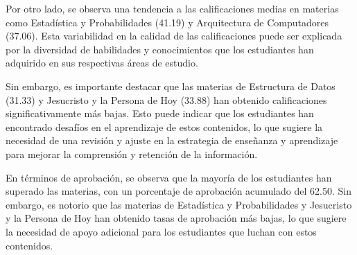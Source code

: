 Por otro lado, se observa una tendencia a las calificaciones medias en materias como Estadística y Probabilidades (41.19) y Arquitectura de Computadores (37.06). Esta variabilidad en la calidad de las calificaciones puede ser explicada por la diversidad de habilidades y conocimientos que los estudiantes han adquirido en sus respectivas áreas de estudio.

Sin embargo, es importante destacar que las materias de Estructura de Datos (31.33) y Jesucristo y la Persona de Hoy (33.88) han obtenido calificaciones significativamente más bajas. Esto puede indicar que los estudiantes han encontrado desafíos en el aprendizaje de estos contenidos, lo que sugiere la necesidad de una revisión y ajuste en la estrategia de enseñanza y aprendizaje para mejorar la comprensión y retención de la información.

En términos de aprobación, se observa que la mayoría de los estudiantes han superado las materias, con un porcentaje de aprobación acumulado del 62.50. Sin embargo, es notorio que las materias de Estadística y Probabilidades y Jesucristo y la Persona de Hoy han obtenido tasas de aprobación más bajas, lo que sugiere la necesidad de apoyo adicional para los estudiantes que luchan con estos contenidos.

